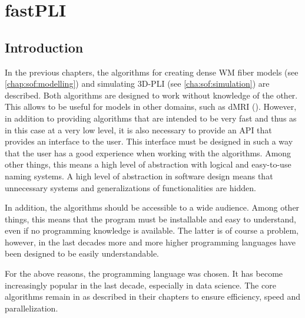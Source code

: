 \setcounter{chapter}{5}
\chapter{\acs{fastPLI}}
\label{chap:Software}
% 
% 
% 
% 
%  
\section{Introduction}\label{sec:fastpliIntro}
% 
In the previous chapters, the algorithms for creating dense \ac{WM} fiber models (see \cref{chap:sof:modelling}) and simulating \ac{3D-PLI} (see \cref{cha:sof:simulation}) are described.
Both algorithms are designed to work without knowledge of the other.
This allows \eg{} to be useful for models in other domains, such as \ac{dMRI} (\cite{Ginsburger2019,ginsburgerDis2019}).
However, in addition to providing algorithms that are intended to be very fast and thus as in this case at a very low level, it is also necessary to provide an \ac{API} that provides an interface to the user.
This interface must be designed in such a way that the user has a good experience when working with the algorithms.
Among other things, this means a high level of abstraction with logical and easy-to-use naming systems.
A high level of abstraction in software design means that unnecessary systems and generalizations of functionalities are hidden.
% 
\par
% 
In addition, the algorithms should be accessible to a wide audience.
Among other things, this means that the program must be installable and easy to understand, even if no programming knowledge is available.
The latter is of course a problem, however, in the last decades more and more higher programming languages have been designed to be easily understandable.
% 
\par
% 
For the above reasons, the \python{} programming language was chosen.
It has become increasingly popular in the last decade, especially in data science.
The core algorithms remain in \cpp{} as described in their chapters to ensure efficiency, speed and parallelization.
%
